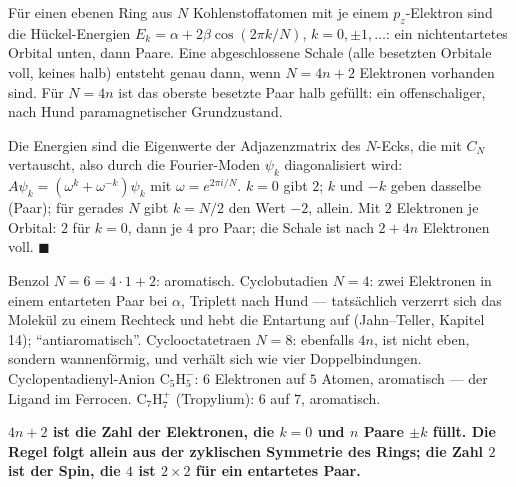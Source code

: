 \begin{merksatz}
Für einen ebenen Ring aus $N$ Kohlenstoffatomen mit je einem $p_z$-Elektron sind die Hückel-Energien $E_k = \alpha + 2\beta\cos(2\pi k/N)$, $k = 0, \pm1, \dots$: ein nichtentartetes Orbital unten, dann Paare. Eine abgeschlossene Schale (alle besetzten Orbitale voll, keines halb) entsteht genau dann, wenn $N = 4n + 2$ Elektronen vorhanden sind. Für $N = 4n$ ist das oberste besetzte Paar halb gefüllt: ein offenschaliger, nach Hund paramagnetischer Grundzustand.

Die Energien sind die Eigenwerte der Adjazenzmatrix des $N$-Ecks, die mit $C_N$ vertauscht, also durch die Fourier-Moden $\psi_k$ diagonalisiert wird: $A\psi_k = (\omega^{k} + \omega^{-k})\psi_k$ mit $\omega = e^{2\pi i/N}$. $k = 0$ gibt $2$; $k$ und $-k$ geben dasselbe (Paar); für gerades $N$ gibt $k = N/2$ den Wert $-2$, allein. Mit $2$ Elektronen je Orbital: $2$ für $k = 0$, dann je $4$ pro Paar; die Schale ist nach $2 + 4n$ Elektronen voll. $\blacksquare$

Benzol $N = 6 = 4\cdot1 + 2$: aromatisch. Cyclobutadien $N = 4$: zwei Elektronen in einem entarteten Paar bei $\alpha$, Triplett nach Hund --- tatsächlich verzerrt sich das Molekül zu einem Rechteck und hebt die Entartung auf (Jahn--Teller, Kapitel 14); \enquote{antiaromatisch}. Cyclooctatetraen $N = 8$: ebenfalls $4n$, ist nicht eben, sondern wannenförmig, und verhält sich wie vier Doppelbindungen. Cyclopentadienyl-Anion $\mathrm{C_5H_5^{-}}$: $6$ Elektronen auf $5$ Atomen, aromatisch --- der Ligand im Ferrocen. $\mathrm{C_7H_7^{+}}$ (Tropylium): $6$ auf $7$, aromatisch.

\begin{center}
\begin{minipage}{0.9\textwidth}
\textbf{$4n + 2$ ist die Zahl der Elektronen, die $k = 0$ und $n$ Paare $\pm k$ füllt. Die Regel folgt allein aus der zyklischen Symmetrie des Rings; die Zahl $2$ ist der Spin, die $4$ ist $2\times2$ für ein entartetes Paar.}
\end{minipage}
\end{center}

\begin{center}
\begin{minipage}{0.88\textwidth}
\end{minipage}
\end{center}
\end{merksatz}

